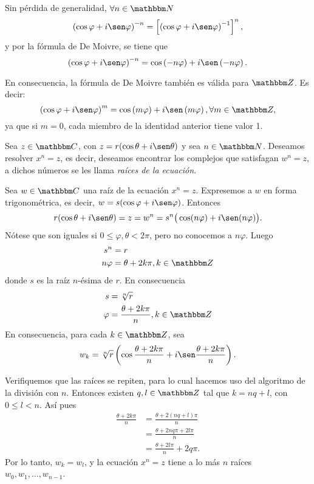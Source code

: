 Sin pérdida de generalidad, $\forall n \in \NN$
$$\left( \cos \varphi +i \sen \varphi \right)^{-n}=\left[ \left( \cos \varphi +i \sen \varphi \right)^{-1} \right]^n,$$
y por la fórmula de De Moivre, se tiene que
$$\left( \cos \varphi +i \sen \varphi \right)^{-n}=\cos \left( -n \varphi \right) +i \sen \left( -n\varphi \right).$$

En consecuencia, la fórmula de De Moivre también es válida para $\ZZ$. Es decir:
$$\left( \cos \varphi +i \sen \varphi \right)^{m}=\cos \left( m \varphi \right) +i \sen \left( m \varphi \right),  \forall m \in \ZZ,$$
ya que si $m=0$, cada miembro de la identidad anterior tiene valor 1.

\newpage

Sea $z \in \CC$, con $z=r(\cos \theta +i \sen \theta )$ y sea $n \in \NN$. Deseamos resolver $x^n=z$, es decir, deseamos encontrar los complejos que satisfagan $w^n=z$, a dichos números se les llama \textit{raíces de la ecuación}.

Sea $w \in \CC$ una raíz de la ecuación $x^n=z$. Expresemos a $w$ en forma trigonométrica, es decir, $w=s(\cos \varphi +i \sen \varphi )$. Entonces
$$r( \cos \theta +i \sen \theta )=z=w^n=s^n\big( \cos (n \varphi )+i \sen (n \varphi ) \big).$$
Nótese que son iguales si $0 \leq \varphi ,  \theta <2 \pi$, pero no conocemos a $n \varphi$. Luego
\begin{align*}
    s^n &=r \\
    n \varphi &=\theta +2k \pi,  k \in \ZZ
\end{align*}
donde $s$ es la raíz $n$-ésima de $r$. En consecuencia
\begin{align*}
    s &=\sqrt[n]{r} \\
    \varphi &=\frac{\theta +2k \pi}{n},  k \in \ZZ
\end{align*}
En consecuencia, para cada $k \in \ZZ$, sea
$$w_k=\sqrt[n]{r} \left( \cos \frac{\theta +2k\pi}{n} +i \sen \frac{\theta +2k\pi}{n} \right).$$

Verifiquemos que las raíces se repiten, para lo cual hacemos uso del algoritmo de la división con $n$. Entonces existen $q, l \in \ZZ$ tal que $k=nq+l$, con $0 \leq l <n$. Así pues
\begin{align*}
    \frac{\theta +2k\pi}{n} &=\frac{\theta +2(nq+l)\pi}{n} \\
    &=\frac{\theta +2nq\pi +2l\pi}{n} \\
    &=\frac{\theta +2l\pi}{n}+2q\pi .
\end{align*}
Por lo tanto, $w_k=w_l$, y la ecuación $x^n=z$ tiene a lo más $n$ raíces $w_0,  w_1,  \dots,  w_{n-1}$.

